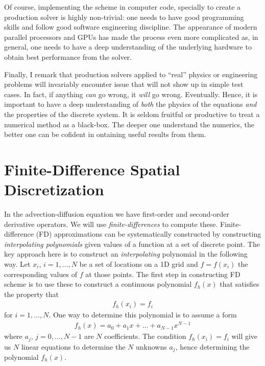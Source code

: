 \documentclass[12pt]{article}
\theoremstyle{definition}
\theoremstyle{definition}
\theoremstyle{definition}
\begin{document}
Of course, implementing the scheme in computer code, specially to
create a production solver is highly non-trivial: one needs to have
good programming skills and follow good software engineering
discipline. The appearance of modern parallel processors and GPUs has
made the process even more complicated as, in general, one needs to
have a deep understanding of the underlying hardware to obtain best
performance from the solver.

Finally, I remark that production solvers applied to ``real'' physics
or engineering problems will invariably encounter issue that will not
show up in simple test cases. In fact, if anything \emph{can} go
wrong, it \emph{will} go wrong. Eventually. Hence, it is important to
have a deep understanding of \emph{both} the physics of the equations
\emph{and} the properties of the discrete system. It is seldom
fruitful or productive to treat a numerical method as a black-box. The
deeper one understand the numerics, the better one can be cofident in
ontaining useful results from them.

\section{Finite-Difference Spatial Discretization}

In the advection-diffusion equation we have first-order and
second-order derivative operators. We will use
\emph{finite-differences} to compute these. Finite-difference (FD)
approximations can be systematically constructed by constructing
\emph{interpolating polynomials} given values of a function at a set
of discrete point. The key approach here is to construct an
\emph{interpolating} polynomial in the following way. Let $x_i$,
$i=1,\ldots,N$ be a set of locations on a 1D grid and $f = f(x_i)$ the
corresponding values of $f$ at those points. The first step in
constructing FD scheme is to use these to construct a continuous
polynomial $f_h(x)$ that satisfies the property that
\begin{align}
  f_h(x_i) = f_i
\end{align}
for $i=1,\ldots,N$. One way to determine this polynomial is to assume
a form
\begin{align}
  f_h(x) = a_0 + a_1 x + \ldots + a_{N-1} x^{N-1}
\end{align}
where $a_j$, $j = 0, \ldots, N-1$ are $N$ coefficients. The condition
$f_h(x_i) = f_i$ will give us $N$ linear equations to determine the
$N$ unknowns $a_j$, hence determining the polynomial $f_h(x)$.
\end{document}
